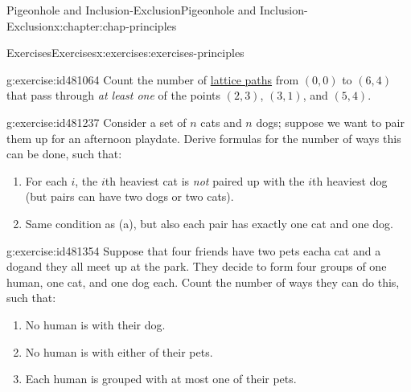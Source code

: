 \documentclass[oneside,10pt,]{book}
\numberwithin{equation}{section}
\begin{document}
\begin{chapterptx}{Pigeonhole and Inclusion-Exclusion}{}{Pigeonhole and Inclusion-Exclusion}{}{}{x:chapter:chap-principles}
\begin{exercises-section}{Exercises}{}{Exercises}{}{}{x:exercises:exercises-principles}
\begin{divisionexercise}{14}{}{}{g:exercise:id481064}%
Count the number of \hyperref[x:example:eg-counting-lattice-path]{lattice paths} from \((0,0)\) to \((6,4)\) that pass through \emph{at least one} of the points \((2,3)\), \((3,1)\), and \((5,4)\).%
\begin{sidebyside}{1}{0.3}{0.3}{0}%
\begin{sbspanel}{0.4}%
%
\end{sbspanel}%
\end{sidebyside}%
\end{divisionexercise}%
\begin{divisionexercise}{15}{}{}{g:exercise:id481237}%
Consider a set of \(n\) cats and \(n\) dogs; suppose we want to pair them up for an afternoon playdate. Derive formulas for the number of ways this can be done, such that:%
\begin{enumerate}[label=(\alph*)]
\item{}For each \(i\), the \(i\)th heaviest cat is \emph{not} paired up with the \(i\)th heaviest dog (but pairs can have two dogs or two cats).%
\item{}Same condition as (a), but also each pair has exactly one cat and one dog.%
\end{enumerate}
%
\end{divisionexercise}%
\begin{divisionexercise}{16}{}{}{g:exercise:id481354}%
Suppose that four friends have two pets each\textemdash{}a cat and a dog\textemdash{}and they all meet up at the park. They decide to form four groups of one human, one cat, and one dog each. Count the number of ways they can do this, such that:%
\begin{enumerate}[label=(\alph*)]
\item{}No human is with their dog.%
\item{}No human is with either of their pets.%
\item{}Each human is grouped with at most one of their pets.%
\end{enumerate}
%
\end{divisionexercise}%
\end{exercises-section}
\end{chapterptx}
\end{document}
